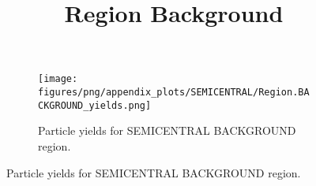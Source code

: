                 \begin{figure}[H]
                    \title{Region Background}
                    \begin{subfigure}[b]{0.5\textwidth}
                        \centering
                        \texttt{[image: figures/png/appendix\_plots/SEMICENTRAL/Region.BACKGROUND\_yields.png]}
                        \caption{Particle yields for SEMICENTRAL BACKGROUND region.}
                        \label{fig:appendix_SEMICENTRAL_BACKGROUND_Inclusive_Yields}
                    \end{subfigure}
                    \caption{Particle yields for SEMICENTRAL BACKGROUND region.}
                    \label{fig:appendix_SEMICENTRAL_BACKGROUND_Inclusive_Yields}
                \end{figure}


    
